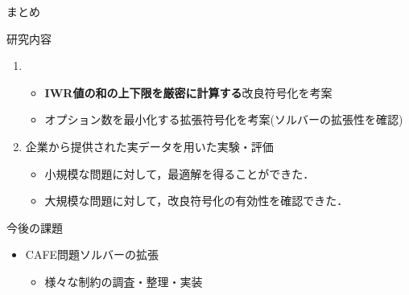 \documentclass[dvipdfmx, 11pt]{beamer}
\begin{document}
\begin{frame}{まとめ}
 \begin{block}{研究内容}
  \begin{enumerate}
   \item {}
	 \begin{itemize}
	  \item \alert{\bf IWR値の和の上下限を厳密に計算する}改良符号化を考案
	  \item オプション数を最小化する拡張符号化を考案(ソルバーの拡張性を確認)
	 \end{itemize}
   \item 企業から提供された実データを用いた実験・評価
	 \begin{itemize}
	  \item 小規模な問題に対して，最適解を得ることができた．
	  \item 大規模な問題に対して，改良符号化の有効性を確認できた．
	 \end{itemize}
  \end{enumerate}
 \end{block}
 \begin{alertblock}{今後の課題}
  \begin{itemize}
   \item CAFE問題ソルバーの拡張
	 \begin{itemize}
	  \item 様々な制約の調査・整理・実装
	 \end{itemize}
  \end{itemize}
 \end{alertblock}
\end{frame}
\end{document}

